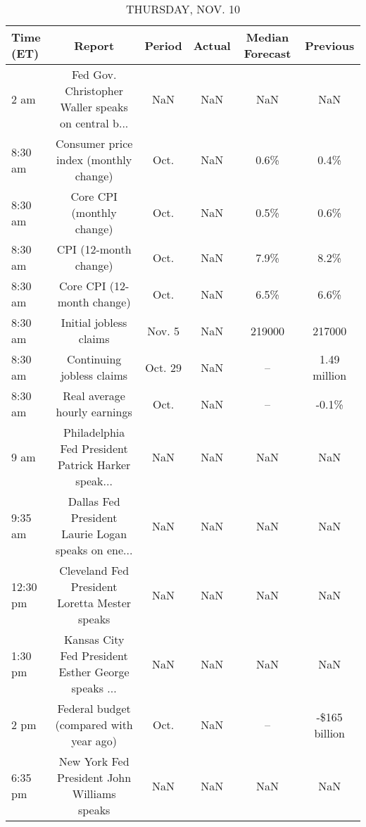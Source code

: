 \documentclass{article}%
\begin{document}
%


\begin{table}[htbp]%
\caption{THURSDAY, NOV. 10}%
\centering%
\begin{adjustbox}{width=1\textwidth}%
\begin{tabular}{lccccc}
\toprule
Time (ET) &                                             Report &  Period & Actual & Median Forecast &      Previous \\
\midrule
     2 am & Fed Gov. Christopher Waller speaks on central b... &     NaN &    NaN &             NaN &           NaN \\
  8:30 am &              Consumer price index (monthly change) &    Oct. &    NaN &            0.6\% &          0.4\% \\
  8:30 am &                          Core CPI (monthly change) &    Oct. &    NaN &            0.5\% &          0.6\% \\
  8:30 am &                              CPI (12-month change) &    Oct. &    NaN &            7.9\% &          8.2\% \\
  8:30 am &                         Core CPI (12-month change) &    Oct. &    NaN &            6.5\% &          6.6\% \\
  8:30 am &                             Initial jobless claims &  Nov. 5 &    NaN &          219000 &        217000 \\
  8:30 am &                          Continuing jobless claims & Oct. 29 &    NaN &              -- &  1.49 million \\
  8:30 am &                       Real average hourly earnings &    Oct. &    NaN &              -- &         -0.1\% \\
     9 am & Philadelphia Fed President Patrick Harker speak... &     NaN &    NaN &             NaN &           NaN \\
  9:35 am & Dallas Fed President Laurie Logan speaks on ene... &     NaN &    NaN &             NaN &           NaN \\
 12:30 pm &      Cleveland Fed President Loretta Mester speaks &     NaN &    NaN &             NaN &           NaN \\
  1:30 pm & Kansas City Fed President Esther George speaks ... &     NaN &    NaN &             NaN &           NaN \\
     2 pm &            Federal budget (compared with year ago) &    Oct. &    NaN &              -- & -\$165 billion \\
  6:35 pm &        New York Fed President John Williams speaks &     NaN &    NaN &             NaN &           NaN \\
\bottomrule
\end{tabular}
%
\end{adjustbox}%
\end{table}
\end{document}
